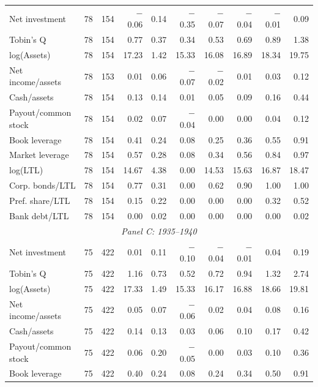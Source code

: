 \begin{table}[p]
\begin{threeparttable}
\begin{tabular}{lrrrrrrrrr}
            \midrule
            Net investment & 78 & 154 & $-$0.06 & 0.14 & $-$0.35 & $-$0.07 & $-$0.04 & $-$0.01 & 0.09 \\
            Tobin's Q & 78 & 154 & 0.77 & 0.37 & 0.34 & 0.53 & 0.69 & 0.89 & 1.38 \\
            log(Assets) & 78 & 154 & 17.23 & 1.42 & 15.33 & 16.08 & 16.89 & 18.34 & 19.75 \\
            Net income/assets & 78 & 153 & 0.01 & 0.06 & $-$0.07 & $-$0.02 & 0.01 & 0.03 & 0.12 \\
            Cash/assets & 78 & 154 & 0.13 & 0.14 & 0.01 & 0.05 & 0.09 & 0.16 & 0.44 \\
            Payout/common stock & 78 & 154 & 0.02 & 0.07 & $-$0.04 & 0.00 & 0.00 & 0.04 & 0.12 \\
            Book leverage & 78 & 154 & 0.41 & 0.24 & 0.08 & 0.25 & 0.36 & 0.55 & 0.91 \\
            Market leverage & 78 & 154 & 0.57 & 0.28 & 0.08 & 0.34 & 0.56 & 0.84 & 0.97 \\
            log(LTL) & 78 & 154 & 14.67 & 4.38 & 0.00 & 14.53 & 15.63 & 16.87 & 18.47 \\
            Corp. bonds/LTL & 78 & 154 & 0.77 & 0.31 & 0.00 & 0.62 & 0.90 & 1.00 & 1.00 \\
            Pref. share/LTL & 78 & 154 & 0.15 & 0.22 & 0.00 & 0.00 & 0.00 & 0.32 & 0.52 \\
            Bank debt/LTL & 78 & 154 & 0.00 & 0.02 & 0.00 & 0.00 & 0.00 & 0.00 & 0.02 \\
            \midrule
            \multicolumn{10}{c}{\textit{Panel C: 1935--1940}} \\
            \midrule
            Net investment & 75 & 422 & 0.01 & 0.11 & $-$0.10 & $-$0.04 & $-$0.01 & 0.04 & 0.19 \\
            Tobin's Q & 75 & 422 & 1.16 & 0.73 & 0.52 & 0.72 & 0.94 & 1.32 & 2.74 \\
            log(Assets) & 75 & 422 & 17.33 & 1.49 & 15.33 & 16.17 & 16.88 & 18.66 & 19.81 \\
            Net income/assets & 75 & 422 & 0.05 & 0.07 & $-$0.06 & 0.02 & 0.04 & 0.08 & 0.16 \\
            Cash/assets & 75 & 422 & 0.14 & 0.13 & 0.03 & 0.06 & 0.10 & 0.17 & 0.42 \\
            Payout/common stock & 75 & 422 & 0.06 & 0.20 & $-$0.05 & 0.00 & 0.03 & 0.10 & 0.36 \\
            Book leverage & 75 & 422 & 0.40 & 0.24 & 0.08 & 0.24 & 0.34 & 0.50 & 0.91 \\

\end{tabular}
\end{threeparttable}
\end{table}
